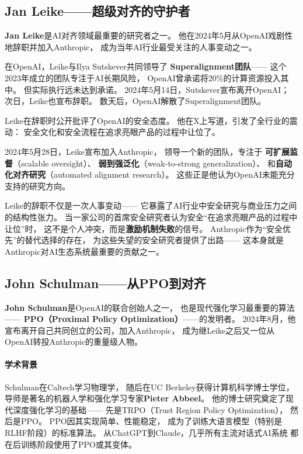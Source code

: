 \subsection{Jan Leike——超级对齐的守护者}
\label{subsec:leike}

\textbf{Jan Leike}是AI对齐领域最重要的研究者之一。
他在2024年5月从OpenAI戏剧性地辞职并加入Anthropic，
成为当年AI行业最受关注的人事变动之一。

在OpenAI，Leike与Ilya Sutskever共同领导了
\textbf{Superalignment团队}——
这个2023年成立的团队专注于AI长期风险，
OpenAI曾承诺将20\%的计算资源投入其中。
但实际执行远未达到承诺。
2024年5月14日，Sutskever宣布离开OpenAI；
次日，Leike也宣布辞职。
数天后，OpenAI解散了Superalignment团队。

Leike在辞职时公开批评了OpenAI的安全态度。
他在X上写道，引发了全行业的震动：
安全文化和安全流程在追求亮眼产品的过程中让位了。

2024年5月28日，Leike宣布加入Anthropic，
领导一个新的团队，专注于
\textbf{可扩展监督}（scalable oversight）、
\textbf{弱到强泛化}（weak-to-strong generalization）、
和\textbf{自动化对齐研究}（automated alignment research）。
这些正是他认为OpenAI未能充分支持的研究方向。

\begin{warnbox}[Leike辞职事件的行业意义]
Leike的辞职不仅是一次人事变动——
它暴露了AI行业中安全研究与商业压力之间的结构性张力。
当一家公司的首席安全研究者认为安全``在追求亮眼产品的过程中让位''时，
这不是个人冲突，而是\textbf{激励机制失败}的信号。
Anthropic作为``安全优先''的替代选择的存在，
为这些失望的安全研究者提供了出路——
这本身就是Anthropic对AI生态系统最重要的贡献之一。
\end{warnbox}

\subsection{John Schulman——从PPO到对齐}
\label{subsec:schulman}

\textbf{John Schulman}是OpenAI的联合创始人之一，
也是现代强化学习最重要的算法——
\textbf{PPO（Proximal Policy Optimization）}——的发明者。
2024年8月，他宣布离开自己共同创立的公司，加入Anthropic，
成为继Leike之后又一位从OpenAI转投Anthropic的重量级人物。

\paragraph{学术背景}
Schulman在Caltech学习物理学，
随后在UC Berkeley获得计算机科学博士学位，
导师是著名的机器人学和强化学习专家\textbf{Pieter Abbeel}。
他的博士研究奠定了现代深度强化学习的基础——
先是TRPO（Trust Region Policy Optimization），
然后是PPO。
PPO因其实现简单、性能稳定，
成为了训练大语言模型（特别是RLHF阶段）的标准算法。
从ChatGPT到Claude，几乎所有主流对话式AI系统
都在后训练阶段使用了PPO或其变体。

